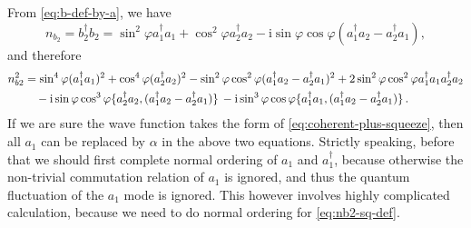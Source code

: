 \documentclass[hyperref, a4paper]{article}
\newcommand*{\ii}{\mathrm{i}}
\begin{document}
From \eqref{eq:b-def-by-a}, we have 
\begin{equation}
    n_{b_2} = b_2^\dagger b_2 = 
    \sin^2 \varphi a_1^\dagger a_1 + \cos^2 \varphi a_2^\dagger a_2
    - \ii \sin \varphi \cos \varphi (a_1^\dagger a_2 - a_2^\dagger a_1),
    \label{eq:nb2-a}
\end{equation}
and therefore 
\begin{equation}
    \begin{aligned}
        n_{b2}^2 &= \sin^4 \varphi (a_1^\dagger a_1)^2 + \cos^4 \varphi (a_2^\dagger a_2)^2 - \sin^2 \varphi \cos^2 \varphi (a_1^\dagger a_2 - a_2^\dagger a_1)^2 + 2 \sin^2 \varphi \cos^2 \varphi a_1^\dagger a_1 a_2^\dagger a_2 \\
        &\quad - \ii \sin \varphi \cos^3 \varphi \acomm*{a_2^\dagger a_2}{(a_1^\dagger a_2 - a_2^\dagger a_1)}
        - \ii \sin^3 \varphi \cos \varphi \acomm*{a_1^\dagger a_1}{(a_1^\dagger a_2 - a_2^\dagger a_1)}.
    \end{aligned}
    \label{eq:nb2-sq-def}
\end{equation}
If we are sure the wave function takes the form of \eqref{eq:coherent-plus-squeeze},
then all $a_1$ can be replaced by $\alpha$ in the above two equations.
Strictly speaking, before that we should first complete normal ordering of $a_1$ and $a_1^\dagger$,
because otherwise the non-trivial commutation relation of $a_1$ is ignored,
and thus the quantum fluctuation of the $a_1$ mode is ignored.
This however involves highly complicated calculation,
because we need to do normal ordering for \eqref{eq:nb2-sq-def}.
\end{document}
